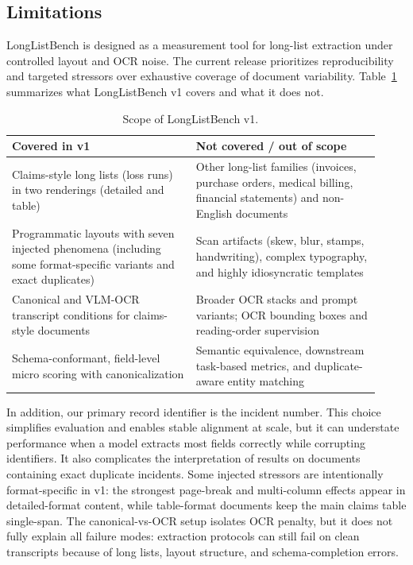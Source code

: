 \subsection{Limitations}
LongListBench is designed as a measurement tool for long-list extraction under controlled layout and OCR noise. The current release prioritizes reproducibility and targeted stressors over exhaustive coverage of document variability. Table~\ref{tab:benchmark-scope} summarizes what LongListBench v1 covers and what it does not.

\begin{table}[t]
\centering
\caption{Scope of LongListBench v1.}
\label{tab:benchmark-scope}
\begin{tabular}{>{\raggedright\arraybackslash}p{0.46\linewidth} >{\raggedright\arraybackslash}p{0.46\linewidth}}
\toprule
Covered in v1 & Not covered / out of scope \\
\midrule
Claims-style long lists (loss runs) in two renderings (detailed and table) & Other long-list families (invoices, purchase orders, medical billing, financial statements) and non-English documents \\
Programmatic layouts with seven injected phenomena (including some format-specific variants and exact duplicates) & Scan artifacts (skew, blur, stamps, handwriting), complex typography, and highly idiosyncratic templates \\
Canonical and VLM-OCR transcript conditions for claims-style documents & Broader OCR stacks and prompt variants; OCR bounding boxes and reading-order supervision \\
Schema-conformant, field-level micro scoring with canonicalization & Semantic equivalence, downstream task-based metrics, and duplicate-aware entity matching \\
\bottomrule
\end{tabular}
\end{table}

In addition, our primary record identifier is the incident number. This choice simplifies evaluation and enables stable alignment at scale, but it can understate performance when a model extracts most fields correctly while corrupting identifiers. It also complicates the interpretation of results on documents containing exact duplicate incidents. Some injected stressors are intentionally format-specific in v1: the strongest page-break and multi-column effects appear in detailed-format content, while table-format documents keep the main claims table single-span. The canonical-vs-OCR setup isolates OCR penalty, but it does not fully explain all failure modes: extraction protocols can still fail on clean transcripts because of long lists, layout structure, and schema-completion errors.

